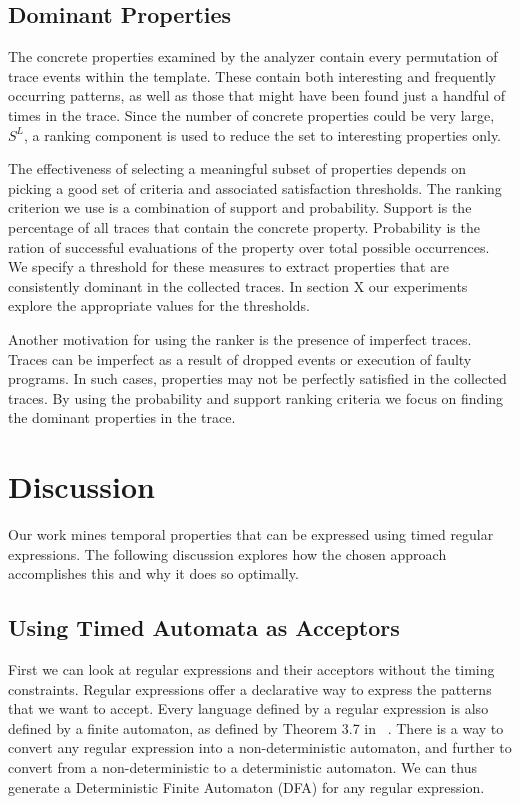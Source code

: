 \documentclass[]{sigplanconf}
\begin{document}
\subsection{Dominant Properties}

The concrete properties examined by the analyzer contain every permutation of trace events within the template. These contain both interesting and frequently occurring patterns, as well as those that might have been found just a handful of times in the trace. Since the number of concrete properties could be very large, $S^L$, a ranking component is used to reduce the set to interesting properties only. 

The effectiveness of selecting a meaningful subset of properties depends on picking a good set of criteria and associated satisfaction thresholds. The ranking criterion we use is a combination of support and probability. Support is the percentage of all traces that contain the concrete property. Probability is the ration of successful evaluations of the property over total possible occurrences. We specify a threshold for these measures to extract properties that are consistently dominant in the collected traces. In section X our experiments explore the appropriate values for the thresholds.

Another motivation for using the ranker is the presence of imperfect traces. Traces can be imperfect as a result of dropped events or execution of faulty programs. In such cases, properties may not be perfectly satisfied in the collected traces. By using the probability and support ranking criteria we focus on finding the dominant properties in the trace. 


\section{Discussion}

Our work mines temporal properties that can be expressed using timed regular expressions. The following discussion explores how the chosen approach accomplishes this and why it does so optimally.

\subsection{Using Timed Automata as Acceptors}

First we can look at regular expressions and their acceptors without the timing constraints. Regular expressions offer a declarative way to express the patterns that we want to accept. Every language defined by a regular expression is also defined by a finite automaton, as defined by Theorem 3.7 in ~\cite{book1}. There is a way to convert any regular expression into a non-deterministic automaton, and further to convert from a non-deterministic to a deterministic automaton. We can thus generate a Deterministic Finite Automaton (DFA) for any regular expression.
\end{document}
